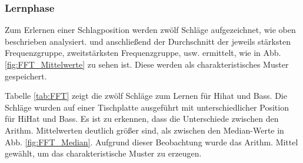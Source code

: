 \subsubsection*{Lernphase}
\label{sec:Lernphase}
Zum Erlernen einer Schlagposition werden zwölf Schläge aufgezeichnet, wie oben beschrieben analysiert. und anschließend der Durchschnitt der jeweils stärksten Frequenzgruppe, zweitstärksten Frequenzgruppe, usw. ermittelt, wie in Abb. \ref{fig:FFT_Mittelwerte} zu sehen ist. Diese werden als charakteristisches Muster gespeichert.

Tabelle \ref{tab:FFT} zeigt die zwölf Schläge zum Lernen für Hihat und Bass.
Die Schläge wurden auf einer Tischplatte ausgeführt mit unterschiedlicher Position für HiHat und Bass.
Es ist zu erkennen, dass die Unterschiede zwischen den Arithm. Mittelwerten deutlich größer sind, als zwischen den Median-Werte in Abb. \ref{fig:FFT_Median}. Aufgrund dieser Beobachtung wurde das Arithm. Mittel gewählt, um das charakteristische Muster zu erzeugen. 

